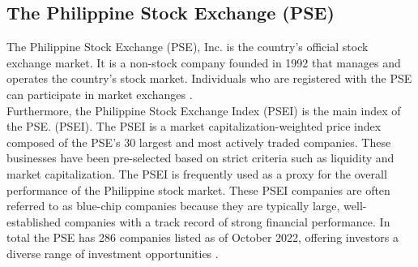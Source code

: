 \subsection{The Philippine Stock Exchange (PSE)}
The Philippine Stock Exchange (PSE), Inc. is the country's official 
stock exchange market. It is a non-stock company founded in 1992 that 
manages and operates the country's stock market. Individuals who are 
registered with the PSE can participate in market exchanges
\cite{PSECompanyInfo}.
\hfill \\

Furthermore, the Philippine Stock Exchange Index (PSEI) 
is the main index of the PSE. (PSEI). The PSEI is a market capitalization-weighted 
price index composed of the PSE's 30 largest and most actively traded companies. 
These businesses have been pre-selected based on strict criteria such as liquidity 
and market capitalization. The PSEI is frequently used as a proxy for the overall 
performance of the Philippine stock market.
\cite{BSP}
These PSEI companies are often referred to as blue-chip companies because 
they are typically large, well-established companies with a track record of 
strong financial performance. In total the PSE has 286 companies listed as 
of October 2022, offering investors a diverse range of investment opportunities
\cite{Fayed2022, PSECompanyList}.